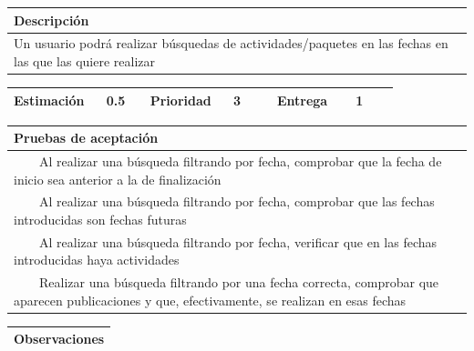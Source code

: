\documentclass[11pt]{article}
\newcommand{\tabitem}{~~\llap{\textbullet}~~}
\begin{document}
  \begin{longtable}{p{1.028\linewidth}}
    \textbf{Descripción}\\
    \midrule
    Un usuario podrá realizar búsquedas de actividades/paquetes en las fechas en las que las quiere realizar
  \end{longtable}
  \begin{longtable}{p{0.18\linewidth}|p{0.1\linewidth}|p{0.18\linewidth}|p{0.1\linewidth}|p{0.18\linewidth}|p{0.1\linewidth}}
    \toprule
    \textbf{Estimación} & 0.5 & \textbf{Prioridad} & 3 & \textbf{Entrega} & 1 \\
    \bottomrule
  \end{longtable}

  \begin{longtable}{p{1.028\linewidth}}
    \textbf{Pruebas de aceptación}\\
    \midrule
    \tabitem Al realizar una búsqueda filtrando por fecha, comprobar que la fecha de inicio sea anterior a la de finalización\\
    \tabitem Al realizar una búsqueda filtrando por fecha, comprobar que las fechas introducidas son fechas futuras\\
    \tabitem Al realizar una búsqueda filtrando por fecha, verificar que en las fechas introducidas haya actividades\\
    \tabitem Realizar una búsqueda filtrando por una fecha correcta, comprobar que aparecen publicaciones y que, efectivamente, se realizan en esas fechas\\
\end{longtable}
\begin{longtable}{p{1.028\linewidth}}
  \textbf{Observaciones}\\
  \midrule
  \bottomrule
  \bottomrule
\end{longtable}
\end{document}
